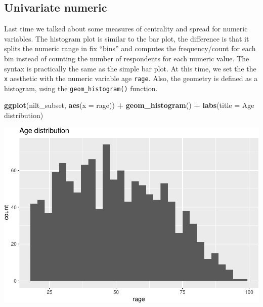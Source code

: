 \documentclass[
]{book}
\newenvironment{Shaded}{\begin{snugshade}}{\end{snugshade}}
\newcommand{\AttributeTok}[1]{\textcolor[rgb]{0.13,0.29,0.53}{#1}}
\newcommand{\FunctionTok}[1]{\textcolor[rgb]{0.13,0.29,0.53}{\textbf{#1}}}
\newcommand{\NormalTok}[1]{#1}
\newcommand{\SpecialCharTok}[1]{\textcolor[rgb]{0.81,0.36,0.00}{\textbf{#1}}}
\newcommand{\StringTok}[1]{\textcolor[rgb]{0.31,0.60,0.02}{#1}}
\begin{document}
\hypertarget{univariate-numeric}{%
\subsection{Univariate numeric}\label{univariate-numeric}}

Last time we talked about some measures of centrality and spread for numeric variables. The histogram plot is similar to the bar plot, the difference is that it splits the numeric range in fix ``bins'' and computes the frequency/count for each bin instead of counting the number of respondents for each numeric value. The syntax is practically the same as the simple bar plot. At this time, we set the the \texttt{x} aesthetic with the numeric variable age \texttt{rage}. Also, the geometry is defined as a histogram, using the \texttt{geom\_histogram()} function.

\begin{Shaded}
\begin{Highlighting}[]
\FunctionTok{ggplot}\NormalTok{(nilt\_subset, }\FunctionTok{aes}\NormalTok{(}\AttributeTok{x =}\NormalTok{ rage)) }\SpecialCharTok{+}
  \FunctionTok{geom\_histogram}\NormalTok{() }\SpecialCharTok{+}
  \FunctionTok{labs}\NormalTok{(}\AttributeTok{title =} \StringTok{\textquotesingle{}Age distribution\textquotesingle{}}\NormalTok{)}
\end{Highlighting}
\end{Shaded}

\begin{flushleft}\includegraphics[width=1\linewidth]{lab-workbook_files/figure-latex/unnamed-chunk-68-1} \end{flushleft}
\end{document}
